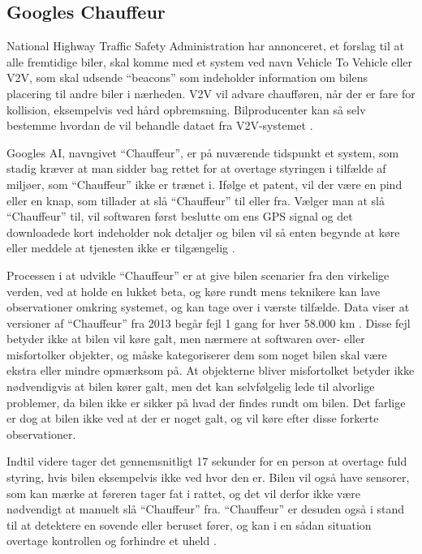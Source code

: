 \subsection{Googles Chauffeur}

National Highway Traffic Safety Administration har annonceret, et forslag til at alle fremtidige biler, skal komme med et system ved navn Vehicle To Vehicle eller V2V, som skal udsende ``beacons'' som indeholder information om bilens placering til andre biler i nærheden. V2V vil advare chaufføren, når der er fare for kollision, eksempelvis ved hård opbremsning. Bilproducenter kan så selv bestemme hvordan de vil behandle dataet fra V2V-systemet \cite{V2V}.

Googles AI, navngivet ``Chauffeur'', er på nuværende tidspunkt et system, som stadig kræver at man sidder bag rettet for at overtage styringen i tilfælde af miljøer, som ``Chauffeur'' ikke er trænet i. Ifølge et patent, vil der være en pind eller en knap, som tillader at slå ``Chauffeur'' til eller fra. Vælger man at slå ``Chauffeur'' til, vil softwaren først beslutte om ens GPS signal og det downloadede kort indeholder nok detaljer og bilen vil så enten begynde at køre eller meddele at tjenesten ikke er tilgængelig \cite{GooglePatent}.

Processen i at udvikle ``Chauffeur'' er at give bilen scenarier fra den virkelige verden, ved at holde en lukket beta, og køre rundt mens teknikere kan lave observationer omkring systemet, og kan tage over i værste tilfælde. Data viser at versioner af ``Chauffeur'' fra 2013 begår fejl 1 gang for hver 58.000 km \cite{PopSci}. Disse fejl betyder ikke at bilen vil køre galt, men nærmere at softwaren over- eller misfortolker objekter, og måske kategoriserer dem som noget bilen skal være ekstra eller mindre opmærksom på. At objekterne bliver misfortolket betyder ikke nødvendigvis at bilen kører galt, men det kan selvfølgelig lede til alvorlige problemer, da bilen ikke er sikker på hvad der findes rundt om bilen. Det farlige er dog at bilen ikke ved at der er noget galt, og vil køre efter disse forkerte observationer.

Indtil videre tager det gennemsnitligt 17 sekunder for en person at overtage fuld styring, hvis bilen eksempelvis ikke ved hvor den er. Bilen vil også have sensorer, som kan mærke at føreren tager fat i rattet, og det vil derfor ikke være nødvendigt at manuelt slå ``Chauffeur'' fra. ``Chauffeur'' er desuden også i stand til at detektere en sovende eller beruset fører, og kan i en sådan situation overtage kontrollen og forhindre et uheld \cite{GooglePatent}.

